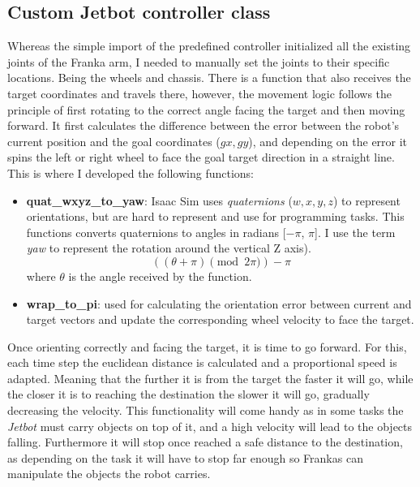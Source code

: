 \subsection{Custom Jetbot controller class}
\label{sec:jetbot_controller}
Whereas the simple import of the predefined controller initialized all the existing joints of the Franka arm, I needed to manually set the joints to their specific locations. Being the wheels and chassis. There is a function that also receives the target coordinates and travels there, however, the movement logic follows the principle of first rotating to the correct angle facing the target and then moving forward. It first calculates the difference between the error between the robot's current position and the goal coordinates ($g{x}, g{y}$), and depending on the error it spins the left or right wheel to face the goal target direction in a straight line. This is where I developed the following functions: 

\begin{itemize}
	\item \textbf{quat\_wxyz\_to\_yaw}: Isaac Sim uses \textit{quaternions} ($w,x,y,z$) to represent orientations, but are hard to represent and use for programming tasks. This functions converts quaternions to angles in radians [$-\pi$, $\pi$]. I use the term \textit{yaw} to represent the rotation around the vertical Z axis). 
	$$((\theta + \pi) \pmod{2\pi}) - \pi$$ 	
	where $\theta$ is the angle received by the function.
	
	\item \textbf{wrap\_to\_pi}: used for calculating the orientation error between current and target vectors and update the corresponding wheel velocity to face the target. 
\end{itemize}

Once orienting correctly and facing the target, it is time to go forward. For this, each time step the euclidean distance is calculated and a proportional speed is adapted. Meaning that the further it is from the target the faster it will go, while the closer it is to reaching the destination the slower it will go, gradually decreasing the velocity. This functionality will come handy as in some tasks the \textit{Jetbot} must carry objects on top of it, and a high velocity will lead to the objects falling. Furthermore it will stop once reached a safe distance to the destination, as depending on the task it will have to stop far enough so Frankas can manipulate the objects the robot carries. 

